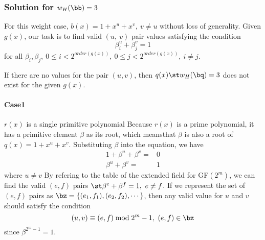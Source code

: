 

\subsubsection{Solution for $w_H(\bb) =3$}
For this weight case, $b(x)=1+x^u+x^v,~v\neq u$ without loss of generality. Given $g(x)$, our task is to find valid $(u,~v)$ pair values satisfying the condition 
$$ \beta_i^u+\beta_j^v=1$$
for all $\beta_i,\beta_j,~0 \leq i <2^{order(g(x))},~0 \leq j <2^{order(g(x))},~i\neq j$.

 If there are no values for the pair $(u,v)$, then $q(x) \st w_H(\bq) =3$ does not exist for the given $g(x)$.
\paragraph{ Case1} $r(x)$ is a single primitive polynomial \newline
Because $r(x)$ is a prime polynomial, it has a primitive element $\beta$ as its root, which means\newline that $\beta$ is also a root of $q(x)=1+x^u+x^v$. Substituting $\beta$ into the equation, we have 
\begin{equation}
\begin{split}
1+\beta^u+\beta^v=&0\\
\beta^u+\beta^v=&1
\end{split}
\end{equation}
where $u\neq v$
By refering to the table of the extended field for GF$(2^m)$, we can find the valid $(e,f)$ pairs $\st \beta^e+\beta^f=1,~e\neq f$.  If we represent the set of $(e,f)$ pairs as 
$\bz=\{ (e_1,f_1) ,( e_2,f_2),\cdots\} $, then any valid value for $u$ and $v$ should satisfy the condition
$$(u,v) \equiv (e,f) \bmod 2^m-1,~(e,f)\in \bz$$ since $\beta^{2^{m}-1}=1$.

